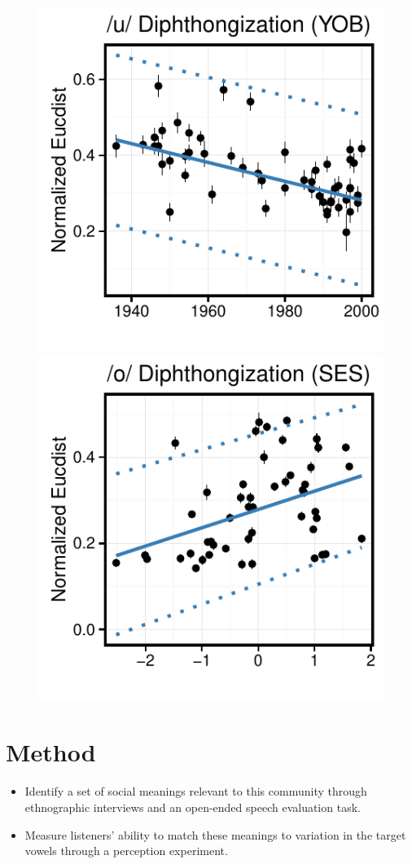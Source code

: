 \documentclass[a0,final]{a0poster}
\begin{document}
\begin{multicols}{4}
\begin{figure}[H]
\includegraphics[scale=1.65]{u_dip_yob.pdf}\includegraphics[scale=1.65]{o_dip_soc.pdf}
\end{figure}
\columnbreak
\section*{Method}
\begin{itemize}
\item{Identify a set of social meanings relevant to this community through ethnographic interviews and an open-ended speech evaluation task.}
\item{Measure listeners' ability to match these meanings to variation in the target vowels through a perception experiment.}
\end{itemize}


\end{multicols}
\end{document}
